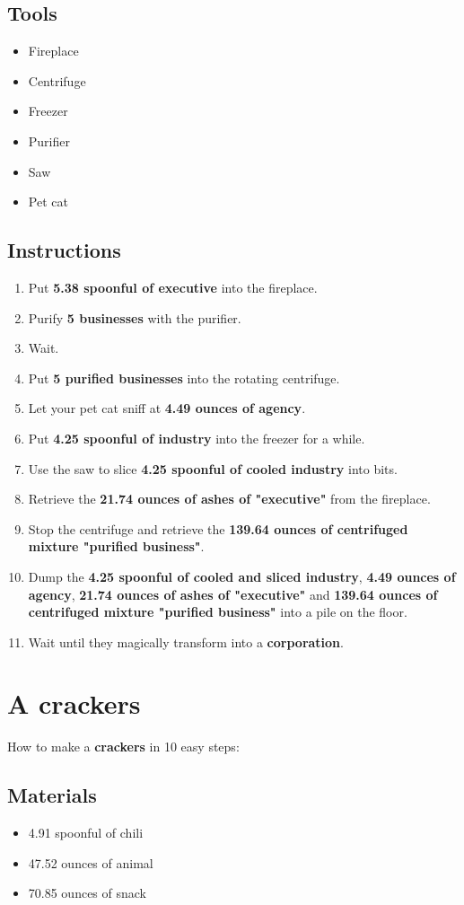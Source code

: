 \documentclass{article}
\begin{document}
\subsection{Tools}\begin{itemize}
\item 
Fireplace
\item 
Centrifuge
\item 
Freezer
\item 
Purifier
\item 
Saw
\item 
Pet cat
\end{itemize}
\subsection{Instructions}\begin{enumerate}
\item 
Put \textbf{5.38 spoonful of executive} into the fireplace.
\item 
Purify \textbf{5 businesses} with the purifier.
\item 
Wait.
\item 
Put \textbf{5 purified businesses} into the rotating centrifuge.
\item 
Let your pet cat sniff at \textbf{4.49 ounces of agency}.
\item 
Put \textbf{4.25 spoonful of industry} into the freezer for a while.
\item 
Use the saw to slice \textbf{4.25 spoonful of cooled industry} into bits.
\item 
Retrieve the \textbf{21.74 ounces of ashes of "executive"} from the fireplace.
\item 
Stop the centrifuge and retrieve the \textbf{139.64 ounces of centrifuged mixture "purified business"}.
\item 
Dump the \textbf{4.25 spoonful of cooled and sliced industry}, \textbf{4.49 ounces of agency}, \textbf{21.74 ounces of ashes of "executive"} and \textbf{139.64 ounces of centrifuged mixture "purified business"} into a pile on the floor.
\item 
Wait until they magically transform into a \textbf{corporation}.
\end{enumerate}
\newpage
\section{A crackers}How to make a \textbf{crackers} in 10 easy steps:

\subsection{Materials}\begin{itemize}
\item 
4.91 spoonful of chili
\item 
47.52 ounces of animal
\item 
70.85 ounces of snack
\end{itemize}
\end{document}
